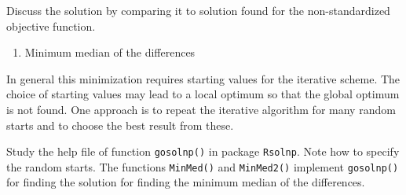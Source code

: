 \documentclass[
]{book}
\providecommand{\tightlist}{%
  \setlength{\itemsep}{0pt}\setlength{\parskip}{0pt}}
\begin{document}
Discuss the solution by comparing it to solution found for the non-standardized objective function.

\begin{enumerate}
\def\labelenumi{(\roman{enumi})}
\setcounter{enumi}{2}
\tightlist
\item
  Minimum median of the differences
\end{enumerate}

In general this minimization requires starting values for the iterative scheme. The choice of starting values may lead to a local optimum so that the global optimum is not found. One approach is to repeat the iterative algorithm for many random starts and to choose the best result from these.

Study the help file of function \texttt{gosolnp()} in package \texttt{Rsolnp}. Note how to specify the random starts. The functions \texttt{MinMed()} and \texttt{MinMed2()} implement \texttt{gosolnp()} for finding the solution for finding the minimum median of the differences.
\end{document}
